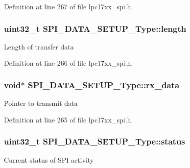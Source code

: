 \-Definition at line 267 of file lpc17xx\-\_\-spi.\-h.

\hypertarget{struct_s_p_i___d_a_t_a___s_e_t_u_p___type_aaf73e8da65385c88a61e0c5f379a2276}{
\subsubsection[{length}]{\setlength{\rightskip}{0pt plus 5cm}uint32\-\_\-t {\bf \-S\-P\-I\-\_\-\-D\-A\-T\-A\-\_\-\-S\-E\-T\-U\-P\-\_\-\-Type\-::length}}}\label{struct_s_p_i___d_a_t_a___s_e_t_u_p___type_aaf73e8da65385c88a61e0c5f379a2276}
\-Length of transfer data 

\-Definition at line 266 of file lpc17xx\-\_\-spi.\-h.

\hypertarget{struct_s_p_i___d_a_t_a___s_e_t_u_p___type_a0d78da6af7beb33da640ae9f219bee4e}{
\subsubsection[{rx\-\_\-data}]{\setlength{\rightskip}{0pt plus 5cm}void$\ast$ {\bf \-S\-P\-I\-\_\-\-D\-A\-T\-A\-\_\-\-S\-E\-T\-U\-P\-\_\-\-Type\-::rx\-\_\-data}}}\label{struct_s_p_i___d_a_t_a___s_e_t_u_p___type_a0d78da6af7beb33da640ae9f219bee4e}
\-Pointer to transmit data 

\-Definition at line 265 of file lpc17xx\-\_\-spi.\-h.

\hypertarget{struct_s_p_i___d_a_t_a___s_e_t_u_p___type_a4daab7cdb918ff07a948c8f872ca6fa7}{
\subsubsection[{status}]{\setlength{\rightskip}{0pt plus 5cm}uint32\-\_\-t {\bf \-S\-P\-I\-\_\-\-D\-A\-T\-A\-\_\-\-S\-E\-T\-U\-P\-\_\-\-Type\-::status}}}\label{struct_s_p_i___d_a_t_a___s_e_t_u_p___type_a4daab7cdb918ff07a948c8f872ca6fa7}
\-Current status of \-S\-P\-I activity 

